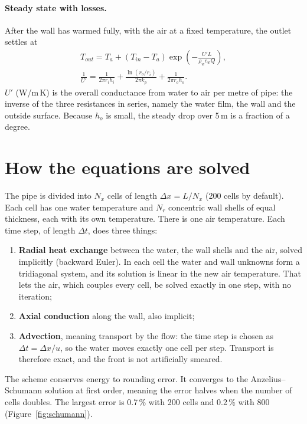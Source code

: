 \documentclass[a4paper,justified]{tufte-handout}
\begin{document}
\paragraph{Steady state with losses.} After the wall has warmed fully, with the
air at a fixed temperature, the outlet settles at
\begin{gather}
  T_{out} = T_a + (T_{in}-T_a)\exp\!\left(-\frac{U'L}{\rho_w c_w Q}\right),\\
  \frac{1}{U'} = \frac{1}{2\pi r_i h_i}+\frac{\ln(r_o/r_i)}{2\pi k_p}+\frac{1}{2\pi r_o h_o}.
\end{gather}
$U'$ (W/m\,K) is the overall conductance from water to air per metre of pipe:
the inverse of the three resistances in series, namely the water film, the wall
and the outside surface. Because $h_o$ is small, the steady drop over 5\,m is a
fraction of a degree.

\section{How the equations are solved}

The pipe is divided into $N_x$ cells of length $\Delta x=L/N_x$ (200 cells by
default). Each cell has one water temperature and $N_r$ concentric wall shells
of equal thickness, each with its own temperature. There is one air
temperature. Each time step, of length $\Delta t$, does three things:
\begin{enumerate}
  \item \textbf{Radial heat exchange} between the water, the wall shells and the
    air, solved implicitly (backward Euler). In each cell the water and wall
    unknowns form a tridiagonal system, and its solution is linear in the new
    air temperature. That lets the air, which couples every cell, be solved
    exactly in one step, with no iteration;
  \item \textbf{Axial conduction} along the wall, also implicit;
  \item \textbf{Advection}, meaning transport by the flow: the time step is
    chosen as $\Delta t=\Delta x/u$, so the water moves exactly one cell per
    step. Transport is therefore exact, and the front is not artificially
    smeared.
\end{enumerate}
The scheme conserves energy to rounding error. It converges to the
Anzelius--Schumann solution at first order, meaning the error halves when the
number of cells doubles. The largest error is 0.7\,\% with 200 cells and
0.2\,\% with 800 (Figure~\ref{fig:schumann}).
\end{document}
